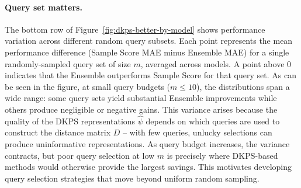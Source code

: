 \paragraph{Query set matters.}
The bottom row of Figure~\ref{fig:dkps-better-by-model} shows performance variation across different random query subsets.
Each point represents the mean performance difference (Sample Score MAE minus Ensemble MAE) for a single randomly-sampled query set of size $m$, averaged across models.
A point above $0$ indicates that the Ensemble outperforms Sample Score for that query set.
As can be seen in the figure, at small query budgets ($m \leq 10$), the distributions span a wide range: some query sets yield substantial Ensemble improvements while others produce negligible or negative gains.
This variance arises because the quality of the DKPS representations $\widehat{\psi}$ depends on which queries are used to construct the distance matrix $D$ -- with few queries, unlucky selections can produce uninformative representations.
As query budget increases, the variance contracts, but poor query selection at low $m$ is precisely where DKPS-based methods would otherwise provide the largest savings.
This motivates developing query selection strategies that move beyond uniform random sampling.
